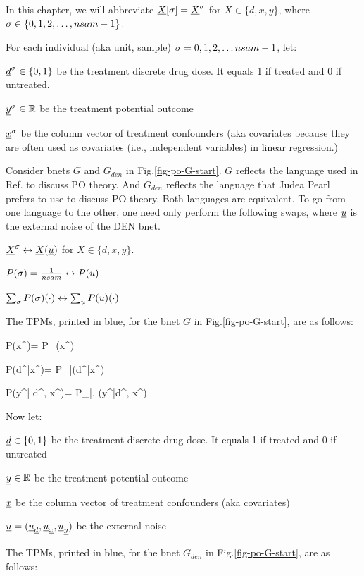 In this chapter, we will
abbreviate
${\underline{X}}[\sigma]={\underline{X}}^\sigma$
for
$X\in \{d, x, y\}$, where 
 $\sigma\in\{0,1,2, \ldots, nsam-1\}$.


For each individual (aka unit, sample) 
$\sigma=0, 1, 2, \ldots nsam-1$, let:

${\underline{d}}^\sigma\in\{0,1\}$ be the
 treatment discrete drug dose.
It equals 1 if 
treated
and 0 if untreated.

${\underline{y}}^\sigma\in { \mathbb{R}}$ be the
 treatment potential outcome

${\underline{x}}^\sigma$ be the column vector of treatment 
confounders 
(aka covariates because they
are often used as covariates (i.e., 
independent
variables) in linear regression.)

Consider bnets $G$ and $G_{den}$
in 
 Fig.\ref{fig-po-G-start}.
$G$ reflects the language
used in Ref.\cite{book-mixtape}
to discuss PO theory. And
$G_{den}$ reflects
the language that Judea Pearl 
prefers to use to discuss PO theory.
Both languages are equivalent. To go from
one language to the other, one need only
perform the following
swaps, where ${\underline{u}}$
is the external noise of the DEN bnet.

${\underline{X}}^\sigma\leftrightarrow {\underline{X}}({\underline{u}})$
for $X\in \{d, x, y\}$.

$P(\sigma)=\frac{1}{nsam}\leftrightarrow P(u)$

$\sum_\sigma P(\sigma) (\cdot)
\leftrightarrow \sum_uP(u) (\cdot)$




The TPMs, printed in blue,
for the bnet
$G$
in Fig.\ref{fig-po-G-start},
are as follows:


\beq\color{blue}
P(x^\s)=
P_{\rvx}(x^\s)
\eeq

\beq\color{blue}
P(d^\s|x^\s)=
P_{\rvd|\rvx}(d^\s|x^\s)
\eeq


\beq\color{blue}
P(y^\s| d^\s, x^\s)=
P_{\rvy|\rvd, \rvx}(y^\s|d^\s, x^\s)
\eeq




Now let:

${\underline{d}}\in\{0,1\}$
be the treatment discrete drug dose.
It equals 
1 if treated and 0 if untreated

${\underline{y}}\in { \mathbb{R}}$ be the
 treatment potential outcome

${\underline{x}}$ be the column vector of 
treatment
confounders (aka covariates)


${\underline{u}}=({\underline{u}}_{\underline{d}}, 
{\underline{u}}_{\underline{x}}, {\underline{u}}_{\underline{y}})$ be the
external noise

The TPMs, printed in blue,
for the bnet
$G_{den}$
in Fig.\ref{fig-po-G-start},
are as follows:


